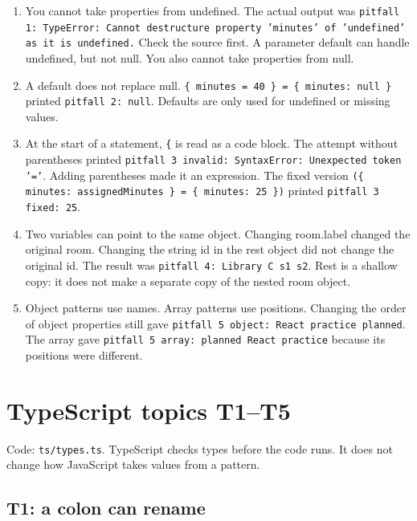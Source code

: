\documentclass[
  10pt,
  a4paper,
]{article}
\providecommand{\tightlist}{%
  \setlength{\itemsep}{0pt}\setlength{\parskip}{0pt}}
\begin{document}
\begin{enumerate}
\def\labelenumi{\arabic{enumi}.}
\tightlist
\item
  You cannot take properties from undefined. The actual output was
  \texttt{pitfall 1:\allowbreak{} TypeError:\allowbreak{} Cannot destructure property 'minutes' of 'undefined' as it is undefined.\allowbreak{}}
  Check the source first. A parameter default can handle undefined, but
  not null. You also cannot take properties from null.
\item
  A default does not replace null.
  \texttt{\{ minutes = 40 \} = \{ minutes:\allowbreak{} null \}} printed
  \texttt{pitfall 2:\allowbreak{} null}. Defaults are only used for
  undefined or missing values.
\item
  At the start of a statement, \texttt{\{} is read as a code block. The
  attempt without parentheses printed
  \texttt{pitfall 3 invalid:\allowbreak{} SyntaxError:\allowbreak{} Unexpected token '='}.
  Adding parentheses made it an expression. The fixed version
  \texttt{(\{ minutes:\allowbreak{} assignedMinutes \} = \{ minutes:\allowbreak{} 25 \})}
  printed \texttt{pitfall 3 fixed:\allowbreak{} 25}.
\item
  Two variables can point to the same object. Changing room.label
  changed the original room. Changing the string id in the rest object
  did not change the original id. The result was
  \texttt{pitfall 4:\allowbreak{} Library C s1 s2}. Rest is a shallow
  copy: it does not make a separate copy of the nested room object.
\item
  Object patterns use names. Array patterns use positions. Changing the
  order of object properties still gave
  \texttt{pitfall 5 object:\allowbreak{} React practice planned}. The
  array gave
  \texttt{pitfall 5 array:\allowbreak{} planned React practice} because
  its positions were different.
\end{enumerate}

\section{TypeScript topics T1--T5}\label{typescript-topics-t1t5}

Code: \texttt{ts/\allowbreak{}types.\allowbreak{}ts}. TypeScript checks
types before the code runs. It does not change how JavaScript takes
values from a pattern.

\subsection{T1: a colon can rename}\label{t1-a-colon-can-rename}
\end{document}
